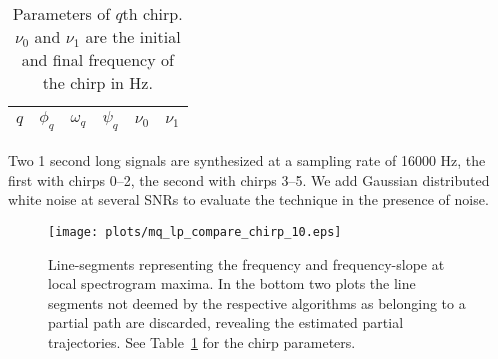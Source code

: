 \documentclass{article}
\newcommand{\TmpCapTitle}[0]{default}
\newcommand{\CaptionWithTitle}[2]{
    \renewcommand{\TmpCapTitle}[0]{\protect#1}
    \captionsetup{format=inc-cap-title}
    \caption[\protect#1.]{#2}
}
\def\figwidthscale{0.5}
\begin{document}
\begin{sloppy}
\begin{table}[!b]
    \caption{Parameters of $q$th chirp. $\nu_{0}$ and $\nu_{1}$ are the initial and
    final frequency of the chirp in Hz. \label{tab:ptrackexamplechirpparams}}
    \begin{center}
        \begin{tabular}{l c c c c c}
            $q$ & $\phi_{q}$ & $\omega_{q}$ & $\psi_{q}$ & $\nu_{0}$ & $\nu_{1}$ \\
            \hline
            
        \end{tabular}
    \end{center}
\end{table}

Two 1 second long signals are synthesized at a sampling rate of 16000 Hz, the
first with chirps 0--2, the second with chirps 3--5. We add
Gaussian distributed white noise at several SNRs to evaluate the technique in the
presence of noise.

\begin{figure}[!t]
    \centering
    \centerline{\texttt{[image: plots/mq\_lp\_compare\_chirp\_10.eps]}}
    \CaptionWithTitle{%
    }{ Line-segments representing the frequency and frequency-slope at local
        spectrogram maxima. In the bottom two plots the line segments not deemed
        by the respective algorithms as belonging to a partial path are
        discarded, revealing the estimated partial trajectories. See
        Table~\ref{tab:ptrackexamplechirpparams} for the chirp parameters.
    \label{plot:mq_lp_compare_chirp_10}}
\end{figure}


\end{sloppy}
\end{document}
